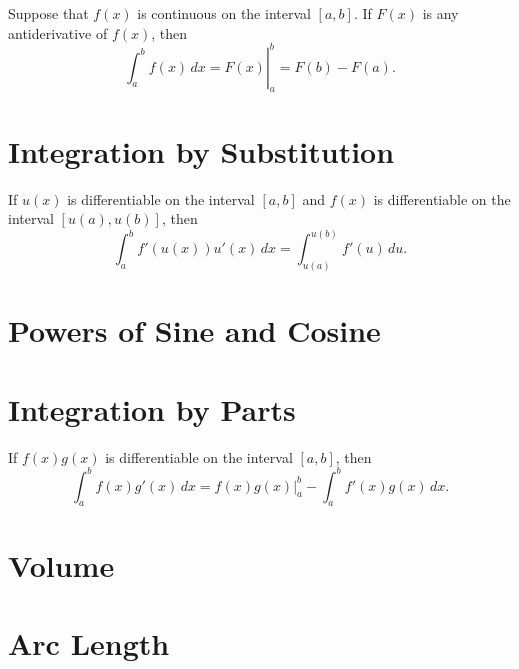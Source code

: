\documentclass{ximera}
\renewcommand{\d}{\,d}
\begin{document}
\begin{theorem}
\label{thm:fundamental_theorem_II}\hfil
\noindent Suppose that $f(x)$ is continuous on the interval $[a,b]$. If $F(x)$
is any antiderivative of $f(x)$, then
\[
\left.\int_a^b f(x)\d x = F(x) \right|_a^b = F(b)-F(a).
\]
\end{theorem}






\section{Integration by Substitution}







\begin{theorem}
If $u(x)$ is differentiable on the interval $[a,b]$ and $f(x)$ is
differentiable on the interval $[u(a),u(b)]$, then
\[
\int_a^b f'(u(x)) u'(x) \d x =\int_{u(a)}^{u(b)} f'(u) \d u.
\]
\end{theorem}







\section{Powers of Sine and Cosine}








\section{Integration by Parts}







\begin{theorem}
If $f(x)g(x)$ is differentiable on the interval $[a,b]$, then
\[
\int_a^b f(x) g'(x) \d x =f(x)g(x) \bigg|_a^b - \int_a^b f'(x) g(x) \d x.
\]
\end{theorem}





\section{Volume}







\section{Arc Length}
\end{document}
